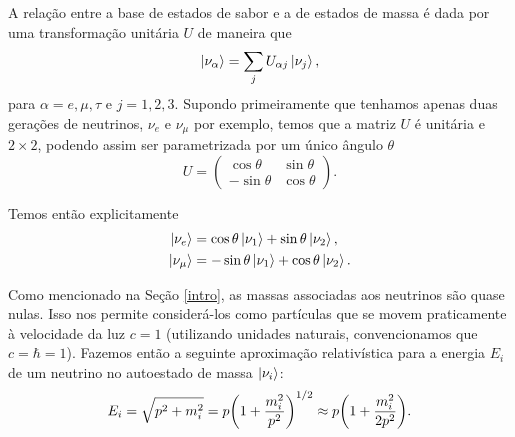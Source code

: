 \documentclass[12pt]{report}
\begin{document}
A relação entre a base de estados de sabor e a de estados de massa é dada por uma transformação unitária $U$ de maneira que
\begin{equation} \label{eq:unitaria}
\ket{\nu_\alpha} = \sum_{j} U_{\alpha j} \ket{\nu_j},
\end{equation}
para $\alpha = e, \mu, \tau$ e $j = 1, 2, 3$. Supondo primeiramente que tenhamos apenas duas gerações de neutrinos, $\nu_e$ e $\nu_\mu$ por exemplo, temos que a matriz $U$ é unitária e $2 \times 2$, podendo assim ser parametrizada por um único ângulo $\theta$
\begin{equation} \label{eq:mix2}
U =
\begin{pmatrix}
\cos\theta & \sin\theta \\
-\sin\theta & \cos\theta
\end{pmatrix}.
\end{equation}

Temos então explicitamente
\begin{equation}
\begin{split}
\ket{\nu_e} &= \cos \theta \ket{\nu_1} + \sin \theta \ket{\nu_2}, \\
\ket{\nu_\mu} &= -\sin \theta \ket{\nu_1} + \cos \theta \ket{\nu_2}.
\end{split}
\end{equation}

Como mencionado na Seção \ref{intro}, as massas associadas aos neutrinos são quase nulas. Isso nos permite considerá-los como partículas que se movem praticamente à velocidade da luz $c = 1$ (utilizando unidades naturais, convencionamos que $c = \hbar = 1$). Fazemos então a seguinte aproximação relativística para a energia $E_i$ de um neutrino no autoestado de massa $\ket{\nu_i}$:
\begin{equation} \label{eq:aprox-energ}
E_i = \sqrt{p^2 + m_i^2} =
p \qty(1 + \frac{m_i^2}{p^2})^{1/2} \approx p \qty( 1 + \frac{m_i^2}{2 p^2} ).
\end{equation}
\end{document}
